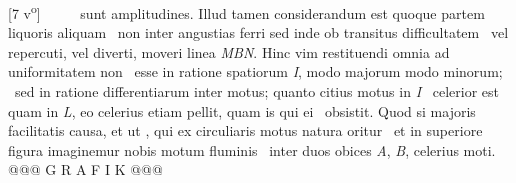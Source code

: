 [7 v\textsuperscript{o}] \ \ \ \ \ sunt amplitudines. Illud tamen considerandum est quoque partem liquoris\protect{} aliquam \ non inter angustias ferri sed inde ob transitus difficultatem \ vel repercuti, vel diverti, moveri linea \textit{MBN}. Hinc  vim restituendi\protect{} omnia ad uniformitatem non \ esse in ratione spatiorum \textit{I}, modo majorum modo minorum; \ sed in ratione differentiarum inter motus; quanto citius motus in \textit{I} \ celerior est quam in \textit{L}, eo celerius etiam pellit, quam is qui ei \ obsistit. Quod si majoris facilitatis causa, et ut , qui ex circuliaris motus natura oritur \ et in superiore figura imaginemur nobis motum fluminis \ inter duos obices \textit{A}, \textit{B}, celerius moti. @@@ G R A F I K @@@%
